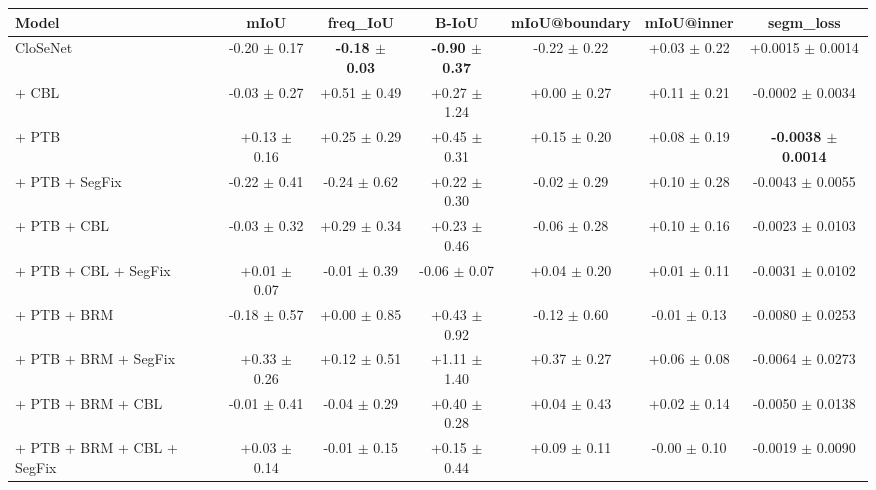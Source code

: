 \begin{tabular}{lcccccc}
\toprule
Model & mIoU & freq\_IoU & B-IoU & mIoU@boundary & mIoU@inner & segm\_loss \\
\midrule
CloSeNet & -0.20 $\pm$ 0.17 & \textbf{-0.18 $\pm$ 0.03} & \textbf{-0.90 $\pm$ 0.37} & -0.22 $\pm$ 0.22 & +0.03 $\pm$ 0.22 & +0.0015 $\pm$ 0.0014 \\
+ CBL & -0.03 $\pm$ 0.27 & +0.51 $\pm$ 0.49 & +0.27 $\pm$ 1.24 & +0.00 $\pm$ 0.27 & +0.11 $\pm$ 0.21 & -0.0002 $\pm$ 0.0034 \\
+ PTB & +0.13 $\pm$ 0.16 & +0.25 $\pm$ 0.29 & +0.45 $\pm$ 0.31 & +0.15 $\pm$ 0.20 & +0.08 $\pm$ 0.19 & \textbf{-0.0038 $\pm$ 0.0014} \\
+ PTB + SegFix & -0.22 $\pm$ 0.41 & -0.24 $\pm$ 0.62 & +0.22 $\pm$ 0.30 & -0.02 $\pm$ 0.29 & +0.10 $\pm$ 0.28 & -0.0043 $\pm$ 0.0055 \\
+ PTB + CBL & -0.03 $\pm$ 0.32 & +0.29 $\pm$ 0.34 & +0.23 $\pm$ 0.46 & -0.06 $\pm$ 0.28 & +0.10 $\pm$ 0.16 & -0.0023 $\pm$ 0.0103 \\
+ PTB + CBL + SegFix & +0.01 $\pm$ 0.07 & -0.01 $\pm$ 0.39 & -0.06 $\pm$ 0.07 & +0.04 $\pm$ 0.20 & +0.01 $\pm$ 0.11 & -0.0031 $\pm$ 0.0102 \\
+ PTB + BRM & -0.18 $\pm$ 0.57 & +0.00 $\pm$ 0.85 & +0.43 $\pm$ 0.92 & -0.12 $\pm$ 0.60 & -0.01 $\pm$ 0.13 & -0.0080 $\pm$ 0.0253 \\
+ PTB + BRM + SegFix & +0.33 $\pm$ 0.26 & +0.12 $\pm$ 0.51 & +1.11 $\pm$ 1.40 & +0.37 $\pm$ 0.27 & +0.06 $\pm$ 0.08 & -0.0064 $\pm$ 0.0273 \\
+ PTB + BRM + CBL & -0.01 $\pm$ 0.41 & -0.04 $\pm$ 0.29 & +0.40 $\pm$ 0.28 & +0.04 $\pm$ 0.43 & +0.02 $\pm$ 0.14 & -0.0050 $\pm$ 0.0138 \\
+ PTB + BRM + CBL + SegFix & +0.03 $\pm$ 0.14 & -0.01 $\pm$ 0.15 & +0.15 $\pm$ 0.44 & +0.09 $\pm$ 0.11 & -0.00 $\pm$ 0.10 & -0.0019 $\pm$ 0.0090 \\
\bottomrule
\end{tabular}
